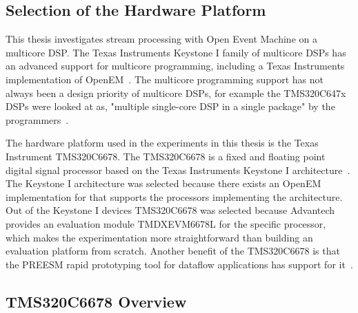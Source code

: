 \subsection{Selection of the Hardware Platform}
\label{subsec:selection-of-platform}
This thesis investigates stream processing with Open Event Machine on a multicore DSP. The Texas Instruments Keystone I family of multicore DSPs has an advanced support for multicore programming, including a Texas Instruments implementation of OpenEM~\cite{MCSDKbrochure}. The multicore programming support has not always been a design priority of multicore DSPs, for example the TMS320C647x DSPs were looked at as, "multiple single-core DSP in a single package" by the programmers~\cite{moerman2014open}.

The hardware platform used in the experiments in this thesis is the Texas Instrument TMS320C6678. The TMS320C6678 is a fixed and floating point digital signal processor based on the Texas Instruments Keystone I architecture~\cite{tmsdatasheet}. The Keystone I architecture was selected because there exists an OpenEM implementation for that supports the processors implementing the architecture. Out of the Keystone I devices TMS320C6678 was selected because Advantech provides an evaluation module TMDXEVM6678L for the specific processor, which makes the experimentation more straightforward than building an evaluation platform from scratch. Another benefit of the TMS320C6678 is that the PREESM rapid prototyping tool for dataflow applications has support for it~\cite{pelcat2014preesm}.

\subsection{TMS320C6678 Overview}
\label{subsec:hw-overview}

